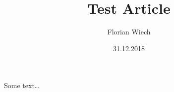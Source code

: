 \documentclass{article}
\title{Test Article}
\date{31.12.2018}
\author{Florian Wiech}
\begin{document}
  \maketitle
  \newpage

  Some text…
\end{document}
